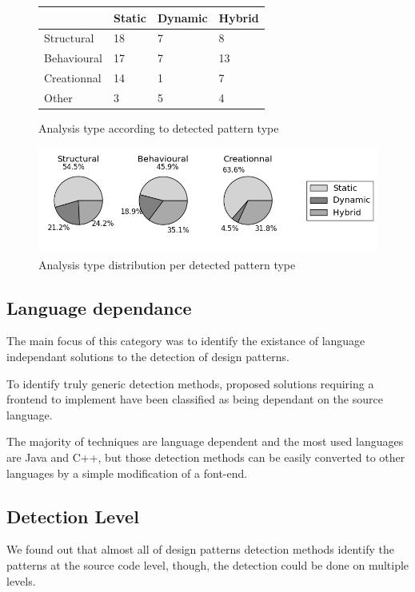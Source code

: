 \documentclass[letterpaper, 10 pt, conference]{ieeeconf}  %
\begin{document}
\begin{figure}
 \centering
 \begin{tabular}{llll}
             & Static & Dynamic & Hybrid \\
 \hline
 Structural  & 18 & 7 & 8 \\
 Behavioural & 17 & 7 & 13 \\
 Creationnal & 14 & 1 & 7 \\
 Other       & 3 & 5 & 4 \\
 \end{tabular}
 \caption{Analysis type according to detected pattern type}
\end{figure}

\begin{figure}[tb]
 \centering
 \includegraphics[scale=0.7]{analysis_v_pattern.png}
 \caption{Analysis type distribution per detected pattern type}
\end{figure}





\subsection{Language dependance}
The main focus of this category was to identify the existance of language
independant solutions to the detection of design patterns.

To identify truly generic detection methods, proposed solutions requiring a
frontend to implement have been classified as being dependant on the source
language. 

The majority of techniques are language dependent and the most used 
languages are Java and C++, but those detection methods can be easily converted
to other languages by a simple modification of a font-end.


\subsection{Detection Level}

We found out that almost all of design patterns detection methods 
identify the patterns at the source code level, though, the detection could
be done on multiple levels.
\end{document}
